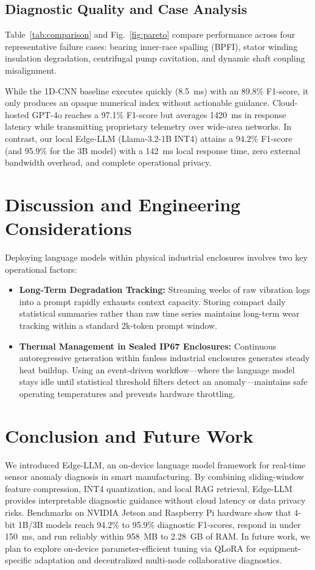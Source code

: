 \documentclass[conference]{IEEEtran}
\begin{document}
\subsection{Diagnostic Quality and Case Analysis}
Table~\ref{tab:comparison} and Fig.~\ref{fig:pareto} compare performance across four representative failure cases: bearing inner-race spalling (BPFI), stator winding insulation degradation, centrifugal pump cavitation, and dynamic shaft coupling misalignment.

While the 1D-CNN baseline executes quickly (8.5~ms) with an 89.8\% F1-score, it only produces an opaque numerical index without actionable guidance. Cloud-hosted GPT-4o reaches a 97.1\% F1-score but averages 1420~ms in response latency while transmitting proprietary telemetry over wide-area networks. In contrast, our local Edge-LLM (Llama-3.2-1B INT4) attains a 94.2\% F1-score (and 95.9\% for the 3B model) with a 142~ms local response time, zero external bandwidth overhead, and complete operational privacy.

\section{Discussion and Engineering Considerations}
Deploying language models within physical industrial enclosures involves two key operational factors:
\begin{itemize}
    \item \textbf{Long-Term Degradation Tracking:} Streaming weeks of raw vibration logs into a prompt rapidly exhausts context capacity. Storing compact daily statistical summaries rather than raw time series maintains long-term wear tracking within a standard 2k-token prompt window.
    \item \textbf{Thermal Management in Sealed IP67 Enclosures:} Continuous autoregressive generation within fanless industrial enclosures generates steady heat buildup. Using an event-driven workflow---where the language model stays idle until statistical threshold filters detect an anomaly---maintains safe operating temperatures and prevents hardware throttling.
\end{itemize}

\section{Conclusion and Future Work}
We introduced Edge-LLM, an on-device language model framework for real-time sensor anomaly diagnosis in smart manufacturing. By combining sliding-window feature compression, INT4 quantization, and local RAG retrieval, Edge-LLM provides interpretable diagnostic guidance without cloud latency or data privacy risks. Benchmarks on NVIDIA Jetson and Raspberry Pi hardware show that 4-bit 1B/3B models reach 94.2\% to 95.9\% diagnostic F1-scores, respond in under 150~ms, and run reliably within 958~MB to 2.28~GB of RAM. In future work, we plan to explore on-device parameter-efficient tuning via QLoRA \cite{dettmers2023qlora} for equipment-specific adaptation and decentralized multi-node collaborative diagnostics.
\end{document}
